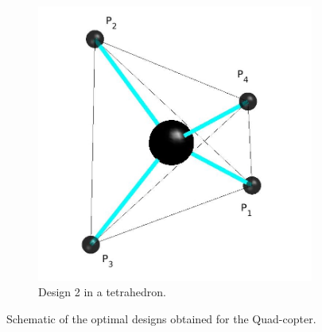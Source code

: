 \begin{figure}[!h]
{  \hspace*{\fill} %
  \begin{subfigure}[b]{0.35\textwidth}
    \includegraphics[width=\linewidth]{images/Quad_tetrahedron.jpg}
    \caption{Design 2 in a tetrahedron.} \label{fig:Quadcopter_2_tetra}
  \end{subfigure}}
  \caption{Schematic of the optimal designs obtained for the Quad-copter.}
  \label{fig:Quadcopter_result}
\end{figure}

